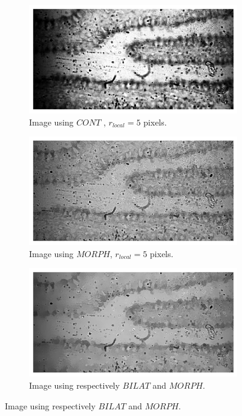 \begin{figure}[h!]
    \medskip
    \begin{subfigure}[b]{0.4\textwidth}
        \centering
        \includegraphics[width=\textwidth, frame]{afbeeldingen/rank/img_cont.png}
        \caption{Image using $CONT$ , $r_{local}=5$ pixels.}   
        \label{fig_rank_cont}
    \end{subfigure}
    \hspace*{\fill}
    \begin{subfigure}[b]{0.4\textwidth}
        \centering
        \includegraphics[width=\textwidth, frame]{afbeeldingen/rank/img_morph.png}
        \caption{Image using $MORPH$, $r_{local}=5$ pixels.}   
        \label{fig_rank_morph}
    \end{subfigure}
    
     \medskip
     \begin{subfigure}[b]{0.4\textwidth}
        \centering
        \includegraphics[width=\textwidth, frame]{afbeeldingen/rank/img_morph_bilat.png}
        \caption{Image using respectively $BILAT$ and $MORPH$.}   
        \label{fig_rank_morph_bilat}
    

\end{subfigure}
\end{figure}
